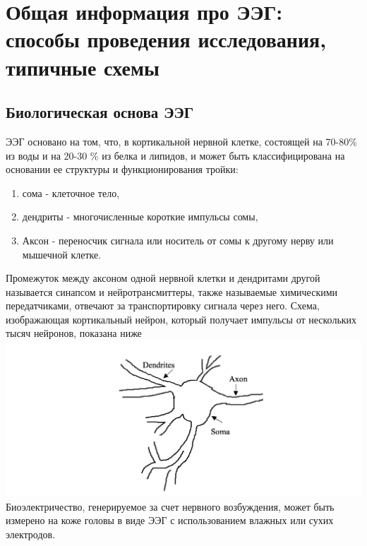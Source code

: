 \documentclass[12pt, a4paper, titlepage]{extreport}
\begin{document}
	\section*{Общая информация про ЭЭГ: способы проведения исследования, типичные схемы}
	\subsection*{Биологическая основа ЭЭГ}
	ЭЭГ основано на том, что, в кортикальной нервной клетке, состоящей на 70-80\% из воды и на 20-30 \% из белка и липидов, и может быть классифицирована на основании ее структуры и функционирования тройки: 
	\begin{enumerate}
		\item сома - клеточное тело,
		\item дендриты - многочисленные короткие импульсы сомы,
		\item Аксон - переносчик сигнала или носитель от сомы к другому нерву или мышечной клетке.
	\end{enumerate}
	 Промежуток между аксоном одной нервной клетки и дендритами другой называется синапсом и нейротрансмиттеры, также называемые химическими передатчиками, отвечают за транспортировку сигнала через него.
	Схема, изображающая кортикальный нейрон, который получает импульсы от нескольких тысяч нейронов, показана ниже\\
	\includegraphics[scale=0.5]{neuron_structure}\\
	Биоэлектричество, генерируемое за счет нервного возбуждения, может быть измерено на коже головы в виде ЭЭГ с использованием влажных или сухих электродов.\cite{41}
\end{document}
